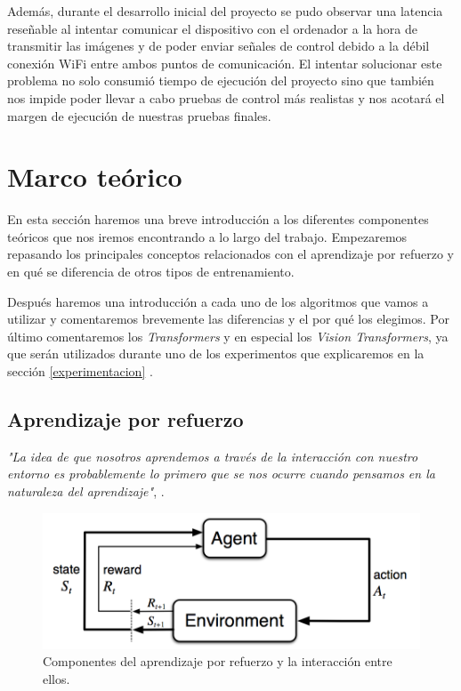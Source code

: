 Además, durante el desarrollo inicial del proyecto se pudo observar una latencia reseñable al intentar comunicar el dispositivo con el ordenador a la hora de transmitir las imágenes y de poder enviar señales de control debido a la débil conexión WiFi entre ambos puntos de comunicación. El intentar solucionar este problema no solo consumió tiempo de ejecución del proyecto sino que también nos impide poder llevar a cabo pruebas de control más realistas y nos acotará el margen de ejecución de nuestras pruebas finales.
\medskip

\section{Marco teórico}

En esta sección haremos una breve introducción a los diferentes componentes teóricos que nos iremos encontrando a lo largo del trabajo. Empezaremos repasando los principales conceptos relacionados con el aprendizaje por refuerzo y en qué se diferencia de otros tipos de entrenamiento. 
\medskip

Después haremos una introducción a cada uno de los algoritmos que vamos a utilizar y comentaremos brevemente las diferencias y el por qué los elegimos.
Por último comentaremos los \textit{Transformers}\citep{transformers} y en especial los \textit{Vision Transformers}\citep{visiontransformers}, ya que serán utilizados durante uno de los experimentos que explicaremos en la sección \ref{experimentacion} .
\medskip

\subsection{Aprendizaje por refuerzo}
\label{aprendizaje-por-refuerzo}

\textit{"La idea de que nosotros aprendemos a través de la interacción con nuestro entorno es probablemente lo primero que se nos ocurre cuando pensamos en la naturaleza del aprendizaje"}, \citep{sutton2018reinforcement}.
\medskip

\begin{figure}[H]
  \centering
  \includegraphics[width=1\textwidth]{figuras/RL_diagram.png}
  \caption[Componentes del aprendizaje por refuerzo y la interacción entre ellos.]{Componentes del aprendizaje por refuerzo y la interacción entre ellos.}
  \label{fig-reinforcement-learning-components}
\end{figure}

